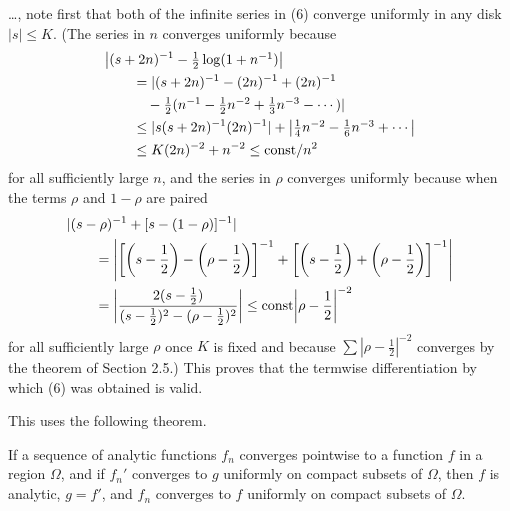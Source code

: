 \documentclass[12pt]{note}
\numberwithin{equation}{chapter}
\begin{document}
\begin{quotebox}
    \dots, note first that both of the infinite series in (6) converge uniformly in
    any disk \( |s| \leq K \). (The series in \( n \) converges uniformly because
    \begin{align*}
         & \abs{(s + 2n)^{-1} - \textstyle\frac{1}{2} \log(1 + n^{-1})}      \\
         & \qquad = |(s + 2n)^{-1} - (2n)^{-1} + (2n)^{-1}                   \\
         & \qquad \quad - \textstyle\frac{1}{2}(n^{-1} - \frac{1}{2}n^{-2} +
        \frac{1}{3}n^{-3} - \cdots )|                                        \\
         & \qquad \leq |s(s + 2n)^{-1}(2n)^{-1}| + \textstyle \abs{
        \frac{1}{4}n^{-2} - \frac{1}{6}n^{-3} + \cdots}                      \\
         & \qquad \leq K(2n)^{-2} + n^{-2} \leq \text{const}/n^2
    \end{align*}
    for all sufficiently large \( n \), and the series in \( \rho \) converges
    uniformly because when the terms \( \rho \) and \( 1 - \rho \) are paired
    \begin{align*}
         & |(s - \rho)^{-1} + [s - (1 - \rho)]^{-1}|                          \\
         & \qquad = \left| \left[\prn{s - \frac{1}{2}} - \prn{\rho -
                \frac{1}{2}}\right]^{-1} + \left[\prn{s - \frac{1}{2}} +
        \prn{\rho - \frac{1}{2}}\right]^{-1} \right|                          \\
         & \qquad = \left\lvert \frac{2(s - \frac{1}{2})}{(s - \frac{1}{2})^2
            - (\rho - \frac{1}{2})^2} \right\rvert
        \leq \text{const} \left\lvert \rho - \frac{1}{2} \right\rvert^{-2}
    \end{align*}
    for all sufficiently large \( \rho \) once \( K \) is fixed and because \( \sum
    |\rho - \frac{1}{2}|^{-2} \) converges by the theorem of Section 2.5.) This
    proves that the termwise differentiation by which (6) was obtained is valid.
\end{quotebox}

This uses the following theorem.
\begin{theorem*}
    If a sequence of analytic functions \( f_n
    \) converges pointwise to a function \( f \) in a region \( \Omega \), and if
    \( f_n' \) converges to \( g \) uniformly on compact subsets of \( \Omega \),
    then \( f \) is analytic, \( g = f' \), and \( f_n \) converges to \( f \)
    uniformly on compact subsets of \( \Omega \).
\end{theorem*}
\end{document}
